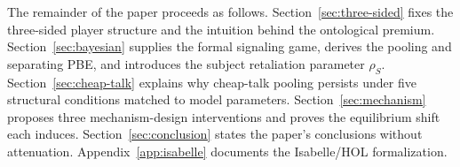 The remainder of the paper proceeds as follows. Section~\ref{sec:three-sided} fixes the three-sided player structure and the intuition behind the ontological premium. Section~\ref{sec:bayesian} supplies the formal signaling game, derives the pooling and separating PBE, and introduces the subject retaliation parameter $\rho_S$. Section~\ref{sec:cheap-talk} explains why cheap-talk pooling persists under five structural conditions matched to model parameters. Section~\ref{sec:mechanism} proposes three mechanism-design interventions and proves the equilibrium shift each induces. Section~\ref{sec:conclusion} states the paper's conclusions without attenuation. Appendix~\ref{app:isabelle} documents the Isabelle/HOL formalization.
